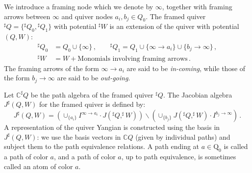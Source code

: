 \documentclass[12pt,a4paper]{article}
\renewcommand{\(}{\left(}
\renewcommand{\)}{\right)}
\renewcommand{\(}{\left(}
\renewcommand{\)}{\right)}
\begin{document}
We introduce a framing node which we denote by $\infty$, together with framing arrows between $\infty$ and quiver nodes $a_i,b_j\in Q_0$. 
The framed quiver $^\sharp Q=\{{}^{\sharp}Q_0,{}^{\sharp}Q_1\}$ with potential ${}^{\sharp}W$ is an extension of the quiver with potential $(Q,W)$:
\begin{equation}\label{eq:extendefig:Dtype_quiverver}
	\begin{aligned}
		{}^\sharp Q_0&=Q_0\cup\{\infty\}\,,\qquad ^\sharp Q_1=Q_1\cup\{\infty\to a_i\}\cup \{b_j\to \infty\}\,,\\
		{}^\sharp W&=W+\text{Monomials involving framing arrows}\,.
	\end{aligned}
\end{equation}
The framing arrows of the form $\infty\to a_i$ are said to be \textit{in-coming}, while those of the form $b_j\to \infty$ are said to be \textit{out-going}.

Let $\mathbb{C}^\sharp Q$ be the path algebra of the framed quiver ${}^\sharp Q$. 
The Jacobian algebra $J^\sharp(Q,W)$ for the framed quiver is defined by:
\begin{equation}\label{eq:jacob}
	J^\sharp(Q,W)=\left(\cup_{\{a_i\}}I^{\infty\to a_i}\cdot J(^\sharp Q,^\sharp W)\right) \backslash\left(\cup_{\{b_j\}}J(^\sharp Q,^\sharp W)\cdot I^{b_j \to \infty}\right)\,.
\end{equation}
A representation of the quiver Yangian is constructed using the basis in $J^\sharp(Q,W)$: we use the basis vectors in $\mathbb{C}Q$ (given by individual paths) and subject them to the path equivalence relations.  
A path ending at $a\in\textrm{Q}_0$ is called a path of color $a$, and a path of color $a$, up to path equivalence, is sometimes called an atom of color $a$.
\end{document}
